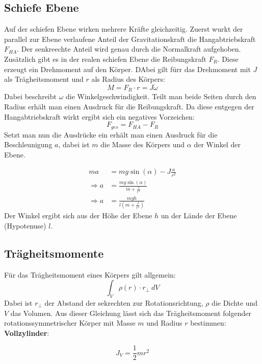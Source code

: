 \subsection{Schiefe Ebene}
Auf der schiefen Ebene wirken mehrere Kräfte gleichzeitig. Zuerst wurkt der parallel zur Ebene verlaufene Anteil der Gravitationskraft die Hangabtriebskraft $F_{HA}$.
Der senkreechte Anteil wird genau durch die Normalkraft aufgehoben.
Zusätzlich gibt es in der realen schiefen Ebene die Reibungskraft $F_R$. Diese erzeugt ein Drehmoment auf den Körper.
DAbei gilt fürr das Drehmoment mit $J$ als Trägheitsmoment und $r$ als Radius des Körpers:
\begin{equation}
    M = F_R \cdot r = J\dot \omega
\end{equation}
Dabei beschreibt $\omega$ die Winkelgeschwindigkeit. Teilt man beide Seiten durch den Radius erhält man einen Ausdruck für die Reibungskraft.
Da diese entgegen der Hangabtriebskraft wirkt ergibt sich ein negatives Vorzeichen:
\begin{equation}
    F_{ges} = F_{HA}-F_R
\end{equation}
Setzt man nun die Ausdrücke ein erhält man einen Ausdruck für die Beschleunigung $a$, dabei ist $m$ die Masse des Körpers und $\alpha$ der Winkel der Ebene.

\begin{align}
    ma & = mg\sin(\alpha)- J\frac{a}{r^2} \\
    \Rightarrow a &=\frac{mg \sin(\alpha)}{m + \frac{J}{r^2}} \\
    \Rightarrow a  &=\frac{mg h}{l (m + \frac{J}{r^2})} \label{eq:a}
\end{align}
Der Winkel ergibt sich aus der Höhe der Ebene $h$ un der Lände der Ebene (Hypotenuse) $l$.

\subsection{Trägheitsmomente}

Für das Trägheitsmoment eines Körpers gilt allgemein:
\begin{equation}
    \int_V \rho(r)\cdot r_{\bot}\  dV
\end{equation}
Dabei ist $r_\bot$ der Abstand der sekrechten zur Rotationsrichtung, $\rho$ die Dichte und $V$ das Volumen.
Aus dieser Gleichung lässt sich das Trägheitsmoment folgender rotationssymmetrischer Körper mit Masse $m$ und Radius $r$ bestimmen:
\textbf{Vollzylinder}:

\begin{equation}
    J_V = \frac{1}{2} mr^2
    \label{eq:JVoll}
\end{equation}

